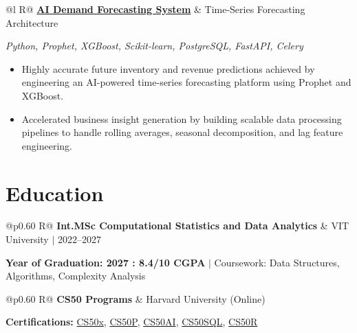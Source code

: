 \documentclass[a4paper,10pt]{article}
\newcommand{\ulink}[2]{\href{#1}{#2}}
\newcommand{\subheading}[1]{{\color[HTML]{0A0A0A}\fontsize{12}{14}\selectfont\bfseries #1}}
\newcommand{\techstack}[1]{{\color[HTML]{5C5C5C}\fontsize{10.5}{12.5}\selectfont\itshape #1}}
\newcommand{\meta}[1]{{\color[HTML]{5C5C5C}\fontsize{10.5}{12.5}\selectfont #1}}
\begin{document}
\begin{tabularx}{\linewidth}{@{}l R@{}}
\subheading{\ulink{https://github.com/su-jin1425/Demand-Forecasting-System}{AI Demand Forecasting System}} & \meta{Time-Series Forecasting Architecture}
\end{tabularx}
\techstack{Python, Prophet, XGBoost, Scikit-learn, PostgreSQL, FastAPI, Celery}
\begin{itemize}[nosep, leftmargin=1.5em, itemsep=2pt, topsep=2pt]
  \item {\color[HTML]{0A0A0A}\fontsize{11}{14}\selectfont Highly accurate future inventory and revenue predictions achieved by engineering an AI-powered time-series forecasting platform using Prophet and XGBoost.}
  \item {\color[HTML]{0A0A0A}\fontsize{11}{14}\selectfont Accelerated business insight generation by building scalable data processing pipelines to handle rolling averages, seasonal decomposition, and lag feature engineering.}
\end{itemize}

\section{Education}
\vspace{2pt}

\begin{tabularx}{\linewidth}{@{}p{0.60\linewidth} R@{}}
\subheading{Int.MSc Computational Statistics and Data Analytics} & \meta{VIT University $|$ 2022--2027}
\end{tabularx}
{\color[HTML]{3A3A3A}\fontsize{11}{14}\selectfont \textbf{Year of Graduation: 2027 : 8.4/10 CGPA} $|$ Coursework: Data Structures, Algorithms, Complexity Analysis}

\begin{tabularx}{\linewidth}{@{}p{0.60\linewidth} R@{}}
\subheading{CS50 Programs} & \meta{Harvard University (Online)}
\end{tabularx}
{\color[HTML]{3A3A3A}\fontsize{11}{14}\selectfont \textbf{Certifications:} \ulink{https://cs50.harvard.edu/certificates/b14b78df-e05c-413e-a607-1dd27303053a}{CS50x}, \ulink{https://cs50.harvard.edu/certificates/32477052-9db4-49c4-a5a4-d7e58429ca2c}{CS50P}, \ulink{https://cs50.harvard.edu/certificates/9cdb4d4a-1250-4f8e-9fd7-191864e0f919}{CS50AI}, \ulink{https://cs50.harvard.edu/certificates/bc486f24-f085-4e61-8536-80940b97a1b9}{CS50SQL}, \ulink{https://cs50.harvard.edu/certificates/666838e6-a053-4d82-b179-a60fe745fd84}{CS50R}}
\end{document}
